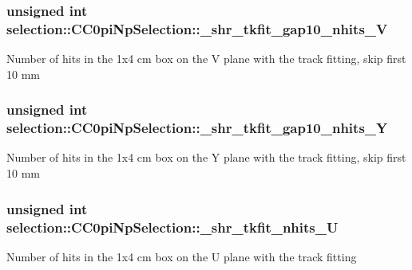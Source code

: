 \subsubsection[{\texorpdfstring{\+\_\+shr\+\_\+tkfit\+\_\+gap10\+\_\+nhits\+\_\+V}{_shr_tkfit_gap10_nhits_V}}]{\setlength{\rightskip}{0pt plus 5cm}unsigned int selection\+::\+C\+C0pi\+Np\+Selection\+::\+\_\+shr\+\_\+tkfit\+\_\+gap10\+\_\+nhits\+\_\+V\hspace{0.3cm}{\ttfamily [private]}}\hypertarget{classselection_1_1CC0piNpSelection_a1dac5397a17c360ce67831fa3ed8aed5}{}\label{classselection_1_1CC0piNpSelection_a1dac5397a17c360ce67831fa3ed8aed5}
Number of hits in the 1x4 cm box on the V plane with the track fitting, skip first 10 mm 
\subsubsection[{\texorpdfstring{\+\_\+shr\+\_\+tkfit\+\_\+gap10\+\_\+nhits\+\_\+Y}{_shr_tkfit_gap10_nhits_Y}}]{\setlength{\rightskip}{0pt plus 5cm}unsigned int selection\+::\+C\+C0pi\+Np\+Selection\+::\+\_\+shr\+\_\+tkfit\+\_\+gap10\+\_\+nhits\+\_\+Y\hspace{0.3cm}{\ttfamily [private]}}\hypertarget{classselection_1_1CC0piNpSelection_ac4f7286273aa34122aa80e6dbf34b9f7}{}\label{classselection_1_1CC0piNpSelection_ac4f7286273aa34122aa80e6dbf34b9f7}
Number of hits in the 1x4 cm box on the Y plane with the track fitting, skip first 10 mm 
\subsubsection[{\texorpdfstring{\+\_\+shr\+\_\+tkfit\+\_\+nhits\+\_\+U}{_shr_tkfit_nhits_U}}]{\setlength{\rightskip}{0pt plus 5cm}unsigned int selection\+::\+C\+C0pi\+Np\+Selection\+::\+\_\+shr\+\_\+tkfit\+\_\+nhits\+\_\+U\hspace{0.3cm}{\ttfamily [private]}}\hypertarget{classselection_1_1CC0piNpSelection_a6c75f5783174133ce97849f128f3dee3}{}\label{classselection_1_1CC0piNpSelection_a6c75f5783174133ce97849f128f3dee3}
Number of hits in the 1x4 cm box on the U plane with the track fitting 
